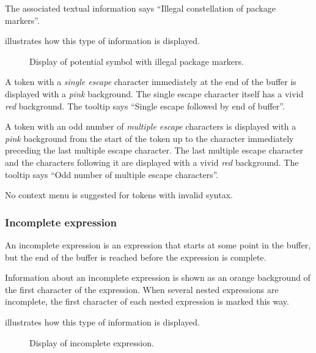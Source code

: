 The associated textual information says ``Illegal constellation of
package markers''. 

 illustrates how this type of
information is displayed.

\begin{figure}
\begin{center}
\end{center}
\caption{\label{fig-invalid-package-markers}
Display of potential symbol with illegal package markers.}
\end{figure}

A token with a \emph{single escape} character immediately at the end
of the buffer is displayed with a \emph{pink} background.  The single
escape character itself has a vivid \emph{red} background.  The
tooltip says ``Single escape followed by end of buffer''.

A token with an odd number of \emph{multiple escape} characters is
displayed with a \emph{pink} background from the start of the token up
to the character immediately preceding the last multiple escape
character.  The last multiple escape character and the characters
following it are displayed with a vivid \emph{red} background.  The
tooltip says ``Odd number of multiple escape characters''.

No context menu is suggested for tokens with invalid syntax.

\subsubsection{Incomplete expression}

An incomplete expression is an expression that starts at some point in
the buffer, but the end of the buffer is reached before the expression
is complete.

Information about an incomplete expression is shown as an orange
background of the first character of the expression.  When several
nested expressions are incomplete, the first character of each nested
expression is marked this way.

 illustrates how this type of
information is displayed.

\begin{figure}
\begin{center}
\end{center}
\caption{\label{fig-incomplete-expression}
Display of incomplete expression.}
\end{figure}

